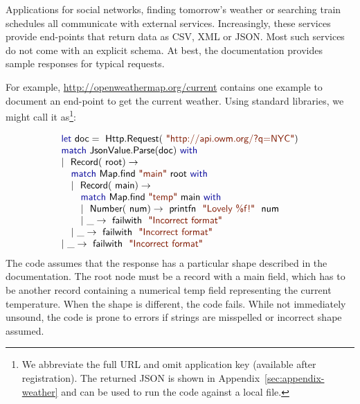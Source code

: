 \documentclass[10pt,nocopyrightspace]{sigplanconf}
\newcommand{\kvd}[1]{\textnormal{\textcolor{kvdclr}{\sffamily #1}}}
\newcommand{\str}[1]{\textnormal{\textcolor{strclr}{\sffamily "#1"}}}
\newcommand{\strf}[1]{\textnormal{\textcolor{strclr}{\sffamily #1}}}
\newcommand{\ident}[1]{\textnormal{\sffamily #1}}
\begin{document}
Applications for social networks, finding tomorrow's weather or searching train schedules
all communicate with external services. Increasingly, these services provide end-points that return
data as CSV, XML or JSON. Most such services do not come with an explicit schema. At best, the
documentation provides sample responses for typical requests.

For example, \url{http://openweathermap.org/current} contains one example to document an end-point
to get the current weather. Using standard libraries, we might call it as\footnote{We abbreviate
the full URL and omit application key (available after registration). The returned JSON is shown
in Appendix~\ref{sec:appendix-weather} and can be used to run the code against a local file.}:

\begin{equation*}
\begin{array}{l}
 \kvd{let}~\ident{doc}=\ident{Http.Request}(\str{http://api.owm.org/?q=NYC}) \\
 \kvd{match}~\ident{JsonValue.Parse}(\ident{doc})~\kvd{with} \\
 |~\ident{Record}(\ident{root})\rightarrow \\
 \quad \kvd{match}~\ident{Map.find}~\str{main}~\ident{root}~\kvd{with} \\
 \quad |~\ident{Record}(\ident{main})\rightarrow \\
 \quad \quad \kvd{match}~\ident{Map.find}~\str{temp}~\ident{main}~\kvd{with} \\
 \quad \quad |~\ident{Number}(\ident{num})\rightarrow \ident{printfn}~\str{Lovely \%f!}~\ident{num} \\
 \quad \quad |~\_\rightarrow \ident{failwith}~\str{Incorrect format} \\
 \quad |~\_\rightarrow \ident{failwith}~\str{Incorrect format} \\
 |~\_\rightarrow \ident{failwith}~\str{Incorrect format}
\end{array}
\end{equation*}
The code assumes that the response has a particular shape described in the documentation. The
root node must be a record with a \strf{main} field, which has to be another record containing
a numerical \strf{temp} field representing the current temperature. When the shape is different,
the code fails. While not immediately unsound, the code is prone to errors if strings are
misspelled or incorrect shape assumed.
\end{document}
